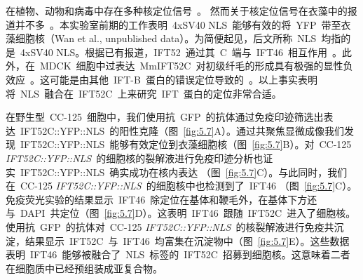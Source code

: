 在植物、动物和病毒中存在多种核定位信号\ \citep{Lange2007,Rasala2014,Kropat2005,Kalderon1984}。 然而关于核定位信号在衣藻中的报道并不多\ \citep{Rasala2014,Lauersen2015}。本实验室前期的工作表明\ 4xSV40 NLS\ 能够有效的将\ YFP\ 带至衣藻细胞核（Wan et al., unpublished data）。为简便起见，后文所称\ NLS\ 均指的是\ 4xSV40 NLS。根据已有报道，IFT52\ 通过其\ C\ 端与\ IFT46\ 相互作用\
\citep{Taschner2016a,Lucker2005,Lucker2010,Taschner2011,Taschner2014,Katoh2016}。此外，在\ MDCK\ 细胞中过表达\ MmIFT52C\ 对初级纤毛的形成具有极强的显性负效应\ \citep{Taschner2014}。这可能是由其他\ IFT-B\ 蛋白的错误定位导致的\
\citep{Taschner2014}。以上事实表明将\ NLS\ 融合在\ IFT52C\ 上来研究\ IFT\ 蛋白的定位非常合适。

在野生型\ CC-125\ 细胞中，我们使用抗\ GFP\ 的抗体通过免疫印迹筛选出表达\ IFT52C::YFP::NLS\ 的阳性克隆（图\ \ref{fig:5.7}A）。通过共聚焦显微成像我们发现\ IFT52C::YFP::NLS\ 能够有效定位到衣藻细胞核（图\ \ref{fig:5.7}B）。对\ CC-125 \textit{IFT52C::YFP::NLS}\ 的细胞核的裂解液进行免疫印迹分析也证实\ IFT52C::YFP::NLS\ 确实成功在核内表达
（图\ \ref{fig:5.7}C）。与此同时，我们在\ CC-125 \textit{IFT52C::YFP::NLS}\ 的细胞核中也检测到了\ IFT46 （图\ \ref{fig:5.7}C）。免疫荧光实验的结果显示\ IFT46\ 除定位在基体和鞭毛外，在基体下方还与\ DAPI\ 共定位（图\ \ref{fig:5.7}D）。这表明\ IFT46\ 跟随\ IFT52C\ 进入了细胞核。使用抗\ GFP\ 的抗体对\ CC-125 \textit{IFT52C::YFP::NLS}\ 的核裂解液进行免疫共沉淀，结果显示\ IFT52C\ 与\ IFT46\ 均富集在沉淀物中（图\ \ref{fig:5.7}E）。这些数据表明\ IFT46\ 能够被融合了\ NLS\ 标签的\ IFT52C\ 招募到细胞核。这意味着二者在细胞质中已经预组装成亚复合物。

